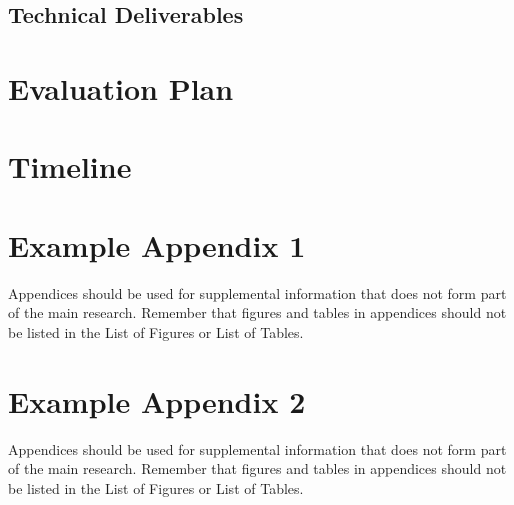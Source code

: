 \documentclass{imc-inf}
\begin{document}
\section{Technical Deliverables}%



\chapter{Evaluation Plan}



\chapter{Timeline}


%
%
%
%
%

\backmatter%
	
 \typeout{}
	
	

\begin{appendices} %
\chapter{Example Appendix 1}

Appendices should be used for supplemental information that does not form part of the main research. Remember that figures and tables in appendices should not be listed in the List of Figures or List of Tables. 

\chapter{Example Appendix 2}

Appendices should be used for supplemental information that does not form part of the main research. Remember that figures and tables in appendices should not be listed in the List of Figures or List of Tables. 
	
\end{appendices}
\end{document}
